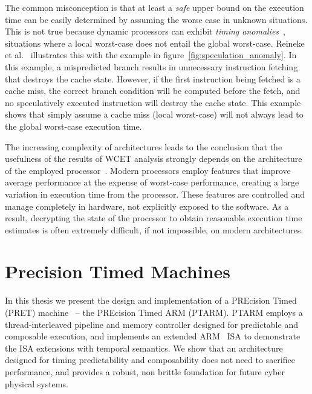 The common misconception is that at least a \emph{safe} upper bound on the execution time can be easily determined by assuming the worse case in unknown situations.
This is not true because dynamic processors can exhibit \emph{timing anomalies}~\cite{Reineke06adefinition,Lundqvist1999}, situations where a local worst-case does not entail the global worst-case.
Reineke et al.~\cite{Reineke06adefinition} illustrates this with the example in figure~\ref{fig:speculation_anomaly}.
In this example, a mispredicted branch results in unnecessary instruction fetching that destroys the cache state. 
However, if the first instruction being fetched is a cache miss, the correct branch condition will be computed before the fetch, and no speculatively executed instruction will destroy the cache state. 
This example shows that simply assume a cache miss (local worst-case) will not always lead to the global worst-case execution time.    

The increasing complexity of architectures leads to the conclusion that the usefulness of the results of WCET analysis strongly depends on the architecture of the employed processor~\cite{Heckmann2003processor}.
Modern processors employ features that improve average performance at the expense of worst-case performance, creating a large variation in execution time from the processor. 
These features are controlled and manage completely in hardware, not explicitly exposed to the software.
As a result, decrypting the state of the processor to obtain reasonable execution time estimates is often extremely difficult, if not impossible, on modern architectures.   

\section{Precision Timed Machines}
In this thesis we present the design and implementation of a PREcision Timed (PRET) machine~\cite{edwards2007case} -- the PREcision Timed ARM (PTARM).
PTARM employs a thread-interleaved pipeline and memory controller designed for predictable and composable execution, and implements an extended ARM~\cite{armrefman} ISA to demonstrate the ISA extensions with temporal semantics.
We show that an architecture designed for timing predictability and composability does not need to sacrifice performance, and provides a robust, non brittle foundation for future cyber physical systems.       
 
